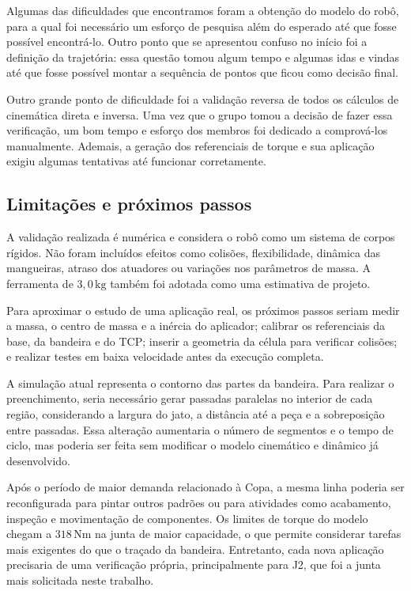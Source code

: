 Algumas das dificuldades que encontramos foram a obtenção do modelo do robô, para a qual foi necessário um esforço de pesquisa além do esperado até que fosse possível encontrá-lo. Outro ponto que se apresentou confuso no início foi a definição da trajetória: essa questão tomou algum tempo e algumas idas e vindas até que fosse possível montar a sequência de pontos que ficou como decisão final.

Outro grande ponto de dificuldade foi a validação reversa de todos os cálculos de cinemática direta e inversa. Uma vez que o grupo tomou a decisão de fazer essa verificação, um bom tempo e esforço dos membros foi dedicado a comprová-los manualmente. Ademais, a geração dos referenciais de torque e sua aplicação exigiu algumas tentativas até funcionar corretamente.

\subsection{Limitações e próximos passos}

A validação realizada é numérica e considera o robô como um sistema de corpos rígidos. Não foram incluídos efeitos como colisões, flexibilidade, dinâmica das mangueiras, atraso dos atuadores ou variações nos parâmetros de massa. A ferramenta de $3{,}0\,\text{kg}$ também foi adotada como uma estimativa de projeto.

Para aproximar o estudo de uma aplicação real, os próximos passos seriam medir a massa, o centro de massa e a inércia do aplicador; calibrar os referenciais da base, da bandeira e do TCP; inserir a geometria da célula para verificar colisões; e realizar testes em baixa velocidade antes da execução completa.

A simulação atual representa o contorno das partes da bandeira. Para realizar o preenchimento, seria necessário gerar passadas paralelas no interior de cada região, considerando a largura do jato, a distância até a peça e a sobreposição entre passadas. Essa alteração aumentaria o número de segmentos e o tempo de ciclo, mas poderia ser feita sem modificar o modelo cinemático e dinâmico já desenvolvido.

Após o período de maior demanda relacionado à Copa, a mesma linha poderia ser reconfigurada para pintar outros padrões ou para atividades como acabamento, inspeção e movimentação de componentes. Os limites de torque do modelo chegam a $318\,\text{Nm}$ na junta de maior capacidade, o que permite considerar tarefas mais exigentes do que o traçado da bandeira. Entretanto, cada nova aplicação precisaria de uma verificação própria, principalmente para J2, que foi a junta mais solicitada neste trabalho.

